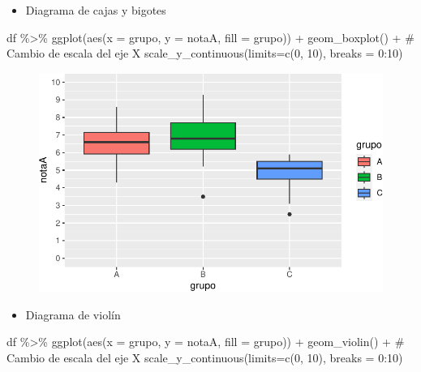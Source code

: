 \documentclass[
  a4paper,
]{scrreport}
\newenvironment{Shaded}{\begin{snugshade}}{\end{snugshade}}
\newcommand{\AttributeTok}[1]{\textcolor[rgb]{0.40,0.45,0.13}{#1}}
\newcommand{\CommentTok}[1]{\textcolor[rgb]{0.37,0.37,0.37}{#1}}
\newcommand{\DecValTok}[1]{\textcolor[rgb]{0.68,0.00,0.00}{#1}}
\newcommand{\FunctionTok}[1]{\textcolor[rgb]{0.28,0.35,0.67}{#1}}
\newcommand{\NormalTok}[1]{\textcolor[rgb]{0.00,0.23,0.31}{#1}}
\newcommand{\SpecialCharTok}[1]{\textcolor[rgb]{0.37,0.37,0.37}{#1}}
\providecommand{\tightlist}{%
  \setlength{\itemsep}{0pt}\setlength{\parskip}{0pt}}\usepackage{longtable,booktabs,array}
\theoremstyle{definition}
\theoremstyle{definition}
\theoremstyle{remark}
\begin{document}
\begin{itemize}
\tightlist
\item
  Diagrama de cajas y bigotes
\end{itemize}

\begin{Shaded}
\begin{Highlighting}[]
\NormalTok{df }\SpecialCharTok{\%\textgreater{}\%} \FunctionTok{ggplot}\NormalTok{(}\FunctionTok{aes}\NormalTok{(}\AttributeTok{x =}\NormalTok{ grupo, }\AttributeTok{y =}\NormalTok{ notaA, }\AttributeTok{fill =}\NormalTok{ grupo)) }\SpecialCharTok{+} 
  \FunctionTok{geom\_boxplot}\NormalTok{() }\SpecialCharTok{+}
  \CommentTok{\# Cambio de escala del eje X}
  \FunctionTok{scale\_y\_continuous}\NormalTok{(}\AttributeTok{limits=}\FunctionTok{c}\NormalTok{(}\DecValTok{0}\NormalTok{, }\DecValTok{10}\NormalTok{), }\AttributeTok{breaks =} \DecValTok{0}\SpecialCharTok{:}\DecValTok{10}\NormalTok{)}
\end{Highlighting}
\end{Shaded}

\begin{figure}[H]

{\centering \includegraphics{08-analisis-estadisticos_files/figure-pdf/unnamed-chunk-47-1.pdf}

}

\end{figure}

\begin{itemize}
\tightlist
\item
  Diagrama de violín
\end{itemize}

\begin{Shaded}
\begin{Highlighting}[]
\NormalTok{df }\SpecialCharTok{\%\textgreater{}\%} \FunctionTok{ggplot}\NormalTok{(}\FunctionTok{aes}\NormalTok{(}\AttributeTok{x =}\NormalTok{ grupo, }\AttributeTok{y =}\NormalTok{ notaA, }\AttributeTok{fill =}\NormalTok{ grupo)) }\SpecialCharTok{+} 
  \FunctionTok{geom\_violin}\NormalTok{() }\SpecialCharTok{+}
  \CommentTok{\# Cambio de escala del eje X}
  \FunctionTok{scale\_y\_continuous}\NormalTok{(}\AttributeTok{limits=}\FunctionTok{c}\NormalTok{(}\DecValTok{0}\NormalTok{, }\DecValTok{10}\NormalTok{), }\AttributeTok{breaks =} \DecValTok{0}\SpecialCharTok{:}\DecValTok{10}\NormalTok{)}
\end{Highlighting}
\end{Shaded}
\end{document}
